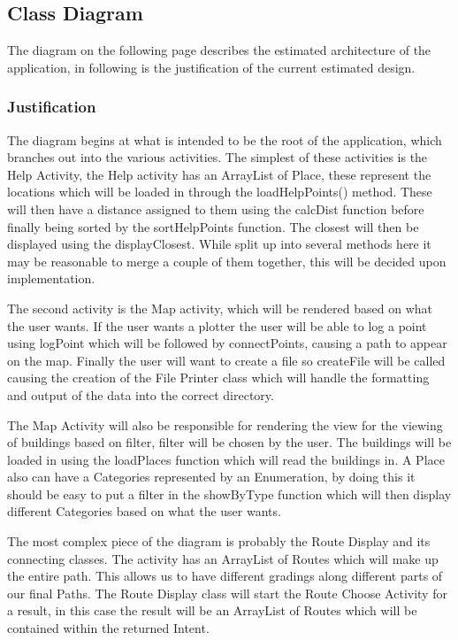 \documentclass[10pt,a4paper]{article}
\begin{document}
\newpage
\restoregeometry
\subsection{Class Diagram}
The diagram on the following page describes the estimated architecture of the application, in following is the justification of the current estimated design.
\subsubsection{Justification}
The diagram begins at what is intended to be the root of the application, which branches out into the various activities. The simplest of these activities is the Help Activity, the Help activity has an ArrayList of Place, these represent the locations which will be loaded in through the loadHelpPoints() method. These will then have a distance assigned to them using the calcDist function before finally being sorted by the sortHelpPoints function. The closest will then be displayed using the displayClosest. While split up into several methods here it may be reasonable to merge a couple of them together, this will be decided upon implementation. 

The second activity is the Map activity, which will be rendered based on what the user wants. If the user wants a plotter the user will be able to log a point using logPoint which will be followed by connectPoints, causing a path to appear on the map. Finally the user will want to create a file so createFile will be called causing the creation of the File Printer class which will handle the formatting and output of the data into the correct directory. 

The Map Activity will also be responsible for rendering the view for the viewing of buildings based on filter, filter will be chosen by the user. The buildings will be loaded in using the loadPlaces function which will read the buildings in. A Place also can have a Categories represented by an Enumeration, by doing this it should be easy to put a filter in the showByType function which will then display different Categories based on what the user wants. 

The most complex piece of the diagram is probably the Route Display and its connecting classes. The activity has an ArrayList of Routes which will make up the entire path. This allows us to have different gradings along different parts of our final Paths. The Route Display class will start the Route Choose Activity for a result, in this case the result will be an ArrayList of Routes which will be contained within the returned Intent. 
\end{document}
